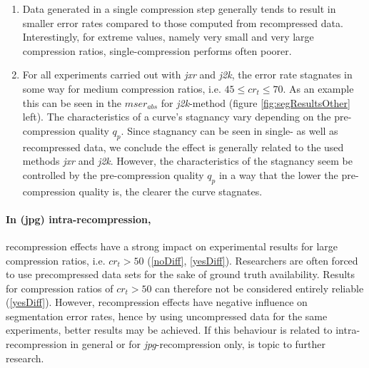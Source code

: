 \documentclass[10pt,twocolumn,letterpaper]{article}
\begin{document}
\begin{enumerate}
 \begin{enumerate}
 	 	\item Data generated in a single compression step generally tends to result in smaller error rates compared to those computed from recompressed data. Interestingly, for extreme values, namely very small and very large compression ratios, single-compression performs often poorer. \label{singleAmongBest}
 	 	
 	 	\item For all experiments carried out with \emph{jxr} and \emph{j2k}, the error rate stagnates in some way for medium compression ratios, i.e. $45 \leq cr_t \leq 70$. As an example this can be seen in the $mser_{abs}$ for \emph{j2k}-method (figure \ref{fig:segResultsOther} left). The characteristics of a curve's stagnancy vary depending on the pre-compression quality $q_p$. Since stagnancy can be seen in single- as well as recompressed data, we conclude the effect is generally related to the used methods \emph{jxr} and \emph{j2k}. However, the characteristics of the stagnancy seem be controlled by the pre-compression quality $q_p$ in a way that the lower the pre-compression quality is, the clearer the curve stagnates. \label{cureFlattening}
\end{enumerate}  
  \end{enumerate}
 
\paragraph{In (jpg) intra-recompression,} recompression effects have a strong impact on experimental results for large compression ratios, i.e. $cr_t > 50$ (\ref{noDiff}, \ref{yesDiff}). Researchers are often forced to use precompressed data sets for the sake of ground truth availability. Results for compression ratios of $cr_t > 50$ can therefore not be considered entirely reliable (\ref{yesDiff}). However, recompression effects have negative influence on segmentation error rates, hence by using uncompressed data for the same experiments, better results may be achieved. If this behaviour is related to intra-recompression in general or for \emph{jpg}-recompression only, is topic to further research.
\end{document}
